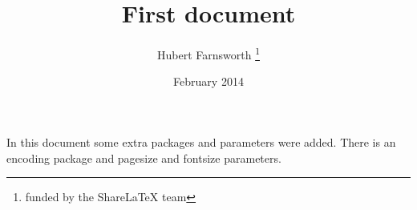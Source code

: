 \documentclass[12pt, letterpaper, twoside]{article}
\title{First document}
\author{Hubert Farnsworth \thanks{funded by the ShareLaTeX team}}
\date{February 2014}
\begin{document}
    \begin{titlepage}
    \maketitle
    \end{titlepage}

    In this document some extra packages and parameters
    were added. There is an encoding package
    and pagesize and fontsize parameters.

    
\end{document}
